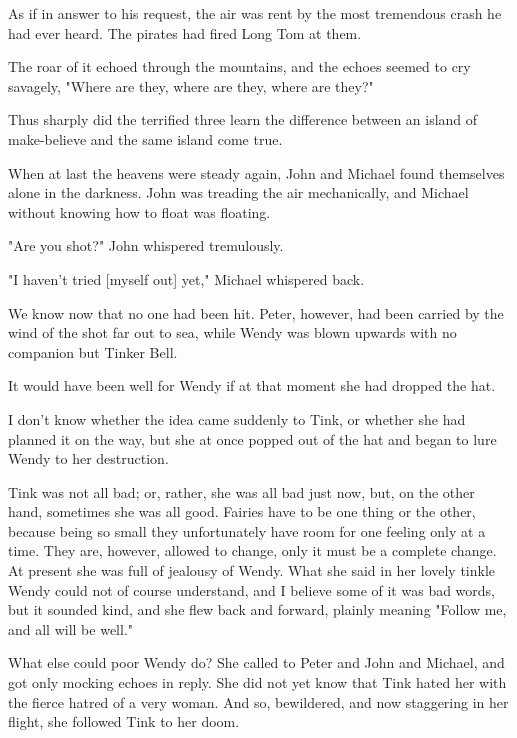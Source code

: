 As if in answer to his request, the air was rent by the most tremendous
crash he had ever heard. The pirates had fired Long Tom at them.


The roar of it echoed through the mountains, and the echoes seemed to cry
savagely, "Where are they, where are they, where are they?"


Thus sharply did the terrified three learn the difference between an
island of make-believe and the same island come true.


When at last the heavens were steady again, John and Michael found
themselves alone in the darkness. John was treading the air mechanically,
and Michael without knowing how to float was floating.


"Are you shot?" John whispered tremulously.


"I haven't tried [myself out] yet," Michael whispered back.


We know now that no one had been hit. Peter, however, had been carried by
the wind of the shot far out to sea, while Wendy was blown upwards with no
companion but Tinker Bell.


It would have been well for Wendy if at that moment she had dropped the
hat.


I don't know whether the idea came suddenly to Tink, or whether she had
planned it on the way, but she at once popped out of the hat and began to
lure Wendy to her destruction.


Tink was not all bad; or, rather, she was all bad just now, but, on the
other hand, sometimes she was all good. Fairies have to be one thing or
the other, because being so small they unfortunately have room for one
feeling only at a time. They are, however, allowed to change, only it must
be a complete change. At present she was full of jealousy of Wendy. What
she said in her lovely tinkle Wendy could not of course understand, and I
believe some of it was bad words, but it sounded kind, and she flew back
and forward, plainly meaning "Follow me, and all will be well."


What else could poor Wendy do? She called to Peter and John and Michael,
and got only mocking echoes in reply. She did not yet know that Tink hated
her with the fierce hatred of a very woman. And so, bewildered, and now
staggering in her flight, she followed Tink to her doom.

